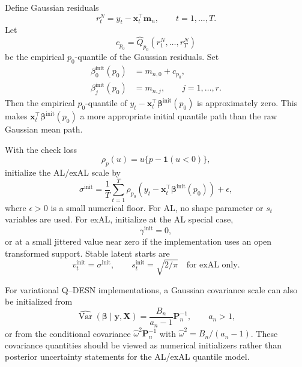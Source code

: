 \documentclass[11pt]{article}
\newcommand{\Var}{\operatorname{Var}}
\newcommand{\vect}[1]{\bm{#1}}
\newcommand{\mat}[1]{\bm{#1}}
\newcommand{\ind}{\mathbf{1}}
\begin{document}
Define Gaussian residuals
\begin{equation}
\label{eq:init_residuals}
r_t^N=y_t-\vect x_t^\top\vect m_n,
\qquad t=1,\ldots,T.
\end{equation}
Let
\begin{equation}
\label{eq:empirical_resid_quantile}
c_{p_0}=\widehat Q_{p_0}(r_1^N,\ldots,r_T^N)
\end{equation}
be the empirical \(p_0\)-quantile of the Gaussian residuals. Set
\begin{align}
\beta_0^{\mathrm{init}}(p_0)&=m_{n,0}+c_{p_0},
\label{eq:init_beta0}\\
\beta_j^{\mathrm{init}}(p_0)&=m_{n,j},
\qquad j=1,\ldots,r.
\label{eq:init_betaj}
\end{align}
Then the empirical \(p_0\)-quantile of
\(y_t-\vect x_t^\top\vect\beta^{\mathrm{init}}(p_0)\) is approximately zero.
This makes \(\vect x_t^\top\vect\beta^{\mathrm{init}}(p_0)\) a more appropriate
initial quantile path than the raw Gaussian mean path.

With the check loss
\begin{equation}
\label{eq:check_loss}
\rho_p(u)=u\{p-\ind(u<0)\},
\end{equation}
initialize the AL/exAL scale by
\begin{equation}
\label{eq:init_sigma}
\sigma^{\mathrm{init}}
=\frac1T\sum_{t=1}^T
\rho_{p_0}\left(y_t-\vect x_t^\top\vect\beta^{\mathrm{init}}(p_0)\right)
+\epsilon,
\end{equation}
where \(\epsilon>0\) is a small numerical floor. For AL, no shape parameter or
\(s_t\) variables are used. For exAL, initialize at the AL special case,
\begin{equation}
\label{eq:init_gamma}
\gamma^{\mathrm{init}}=0,
\end{equation}
or at a small jittered value near zero if the implementation uses an open
transformed support. Stable latent starts are
\begin{equation}
\label{eq:init_latents}
v_t^{\mathrm{init}}=\sigma^{\mathrm{init}},
\qquad
s_t^{\mathrm{init}}=\sqrt{2/\pi}\quad\text{for exAL only}.
\end{equation}

For variational Q--DESN implementations, a Gaussian covariance scale can also
be initialized from
\begin{equation}
\label{eq:init_covariance}
\widehat{\Var}(\vect\beta\mid\vect y,\mat X)
=\frac{B_n}{a_n-1}\mat P_n^{-1},
\qquad a_n>1,
\end{equation}
or from the conditional covariance
\(\widehat\omega^2\mat P_n^{-1}\) with
\(\widehat\omega^2=B_n/(a_n-1)\). These covariance quantities should be viewed
as numerical initializers rather than posterior uncertainty statements for the
AL/exAL quantile model.
\end{document}
